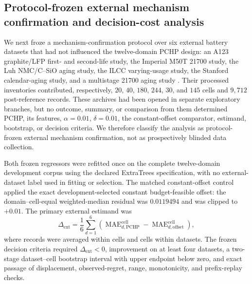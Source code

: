 \documentclass[preprint,12pt]{elsarticle}
\begin{document}
\subsection{Protocol-frozen external mechanism confirmation and decision-cost analysis}

We next froze a mechanism-confirmation protocol over six external battery datasets that had not influenced the twelve-domain PCHP design: an A123 graphite/LFP first- and second-life study, the Imperial M50T 21700 study, the Luh NMC/C--SiO aging study, the ILCC varying-usage study, the Stanford calendar-aging study, and a multistage 21700 aging study \citep{wheeler2025lfp,kirkaldy2024comprehensive,luh2024dataset,li2024varyingusage,lam2025calendar,stroebl2024multistage}. Their processed inventories contributed, respectively, $20$, $40$, $180$, $244$, $30$, and $145$ cells and $9{,}712$ post-reference records. These archives had been opened in separate exploratory branches, but no outcome, summary, or comparison from them determined PCHP, its features, $\alpha=0.01$, $\delta=0.01$, the constant-offset comparator, estimand, bootstrap, or decision criteria. We therefore classify the analysis as protocol-frozen external mechanism confirmation, not as prospectively blinded data collection.

Both frozen regressors were refitted once on the complete twelve-domain development corpus using the declared ExtraTrees specification, with no external-dataset label used in fitting or selection. The matched constant-offset control applied the exact development-selected constant budget-feasible offset: the domain--cell-equal weighted-median residual was $0.0119494$ and was clipped to $+0.01$. The primary external estimand was
\begin{equation}
\Delta_{\mathrm{ext}}=\frac{1}{6}\sum_{d=1}^{6}
\left(\operatorname{MAE}^{\mathrm{cell}}_{d,\mathrm{PCHP}}-
\operatorname{MAE}^{\mathrm{cell}}_{d,\mathrm{offset}}\right),
\label{eq:external_estimand}
\end{equation}
where records were averaged within cells and cells within datasets. The frozen decision criteria required $\Delta_{\mathrm{ext}}<0$, improvement on at least four datasets, a two-stage dataset--cell bootstrap interval with upper endpoint below zero, and exact passage of displacement, observed-regret, range, monotonicity, and prefix-replay checks.
\end{document}

